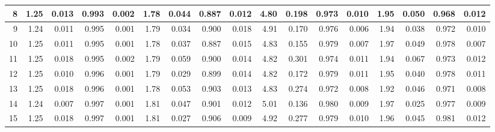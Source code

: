 \documentclass[
]{article}
\begin{document}
\begin{table}[H]
{\begin{tabular}[t]{r|r|r|r|r|r|r|r|r|r|r|r|r|r|r|r|r}
\hline
\hspace{1em}8 & 1.25 & 0.013 & 0.993 & 0.002 & 1.78 & 0.044 & 0.887 & 0.012 & 4.80 & 0.198 & 0.973 & 0.010 & 1.95 & 0.050 & 0.968 & 0.012\\
\hline
\hspace{1em}9 & 1.24 & 0.011 & 0.995 & 0.001 & 1.79 & 0.034 & 0.900 & 0.018 & 4.91 & 0.170 & 0.976 & 0.006 & 1.94 & 0.038 & 0.972 & 0.010\\
\hline
\hspace{1em}10 & 1.25 & 0.011 & 0.995 & 0.001 & 1.78 & 0.037 & 0.887 & 0.015 & 4.83 & 0.155 & 0.979 & 0.007 & 1.97 & 0.049 & 0.978 & 0.007\\
\hline
\hspace{1em}11 & 1.25 & 0.018 & 0.995 & 0.002 & 1.79 & 0.059 & 0.900 & 0.014 & 4.82 & 0.301 & 0.974 & 0.011 & 1.94 & 0.067 & 0.973 & 0.012\\
\hline
\hspace{1em}12 & 1.25 & 0.010 & 0.996 & 0.001 & 1.79 & 0.029 & 0.899 & 0.014 & 4.82 & 0.172 & 0.979 & 0.011 & 1.95 & 0.040 & 0.978 & 0.011\\
\hline
\hspace{1em}13 & 1.25 & 0.018 & 0.996 & 0.001 & 1.78 & 0.053 & 0.903 & 0.013 & 4.83 & 0.274 & 0.972 & 0.008 & 1.92 & 0.046 & 0.971 & 0.008\\
\hline
\hspace{1em}14 & 1.24 & 0.007 & 0.997 & 0.001 & 1.81 & 0.047 & 0.901 & 0.012 & 5.01 & 0.136 & 0.980 & 0.009 & 1.97 & 0.025 & 0.977 & 0.009\\
\hline
\hspace{1em}15 & 1.25 & 0.018 & 0.997 & 0.001 & 1.81 & 0.027 & 0.906 & 0.009 & 4.92 & 0.277 & 0.979 & 0.010 & 1.96 & 0.045 & 0.981 & 0.012\\
\hline
\end{tabular}}
\end{table}
\end{document}
